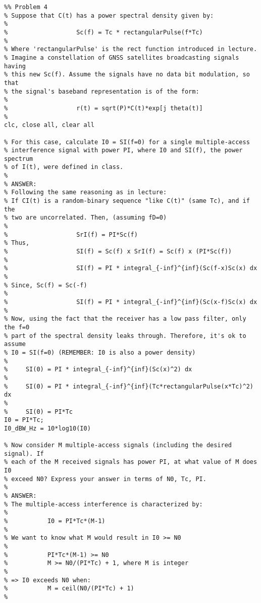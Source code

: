 \begin{lstlisting}
%% Problem 4
% Suppose that C(t) has a power spectral density given by:
%
%                   Sc(f) = Tc * rectangularPulse(f*Tc)
%
% Where 'rectangularPulse' is the rect function introduced in lecture.
% Imagine a constellation of GNSS satellites broadcasting signals having
% this new Sc(f). Assume the signals have no data bit modulation, so that
% the signal's baseband representation is of the form:
%
%                   r(t) = sqrt(P)*C(t)*exp[j theta(t)]
%
clc, close all, clear all

% For this case, calculate I0 = SI(f=0) for a single multiple-access
% interference signal with power PI, where I0 and SI(f), the power spectrum
% of I(t), were defined in class.
%
% ANSWER:
% Following the same reasoning as in lecture:
% If CI(t) is a random-binary sequence "like C(t)" (same Tc), and if the
% two are uncorrelated. Then, (assuming fD=0)
%                       
%                   SrI(f) = PI*Sc(f)
% Thus, 
%                   SI(f) = Sc(f) x SrI(f) = Sc(f) x (PI*Sc(f))
%
%                   SI(f) = PI * integral_{-inf}^{inf}(Sc(f-x)Sc(x) dx
%
% Since, Sc(f) = Sc(-f)
%
%                   SI(f) = PI * integral_{-inf}^{inf}(Sc(x-f)Sc(x) dx
%
% Now, using the fact that the receiver has a low pass filter, only the f=0
% part of the spectral density leaks through. Therefore, it's ok to assume 
% I0 = SI(f=0) (REMEMBER: I0 is also a power density)
%
%     SI(0) = PI * integral_{-inf}^{inf}(Sc(x)^2) dx
%
%     SI(0) = PI * integral_{-inf}^{inf}(Tc*rectangularPulse(x*Tc)^2) dx
%
%     SI(0) = PI*Tc
I0 = PI*Tc;
I0_dBW_Hz = 10*log10(I0)

% Now consider M multiple-access signals (including the desired signal). If
% each of the M received signals has power PI, at what value of M does I0
% exceed N0? Express your answer in terms of N0, Tc, PI.
%
% ANSWER:
% The multiple-access interference is characterized by:
%
%           I0 = PI*Tc*(M-1)
%
% We want to know what M would result in I0 >= N0
%
%           PI*Tc*(M-1) >= N0
%           M >= N0/(PI*Tc) + 1, where M is integer
%        
% => I0 exceeds N0 when:
%           M = ceil(N0/(PI*Tc) + 1)
%
\end{lstlisting}
